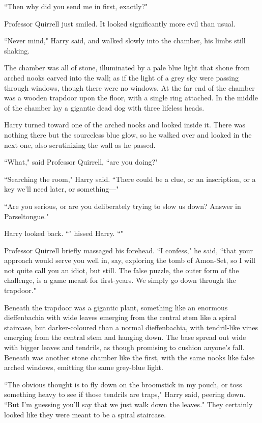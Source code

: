 ``Then why did you send me in first, exactly?"

Professor Quirrell just smiled. It looked significantly more evil than usual.

``Never mind," Harry said, and walked slowly into the chamber, his limbs still shaking.

The chamber was all of stone, illuminated by a pale blue light that shone from arched nooks carved into the wall; as if the light of a grey sky were passing through windows, though there were no windows. At the far end of the chamber was a wooden trapdoor upon the floor, with a single ring attached. In the middle of the chamber lay a gigantic dead dog with three lifeless heads.

Harry turned toward one of the arched nooks and looked inside it. There was nothing there but the sourceless blue glow, so he walked over and looked in the next one, also scrutinizing the wall as he passed.

``What," said Professor Quirrell, ``are you doing?"

``Searching the room," Harry said. ``There could be a clue, or an inscription, or a key we'll need later, or something—"

``Are you serious, or are you deliberately trying to slow us down? Answer in Parseltongue."

Harry looked back. ``" hissed Harry. ``"

Professor Quirrell briefly massaged his forehead. ``I confess," he said, ``that your approach would serve you well in, say, exploring the tomb of Amon-Set, so I will not quite call you an idiot, but still. The false puzzle, the outer form of the challenge, is a game meant for first-years. We simply go down through the trapdoor."

Beneath the trapdoor was a gigantic plant, something like an enormous dieffenbachia with wide leaves emerging from the central stem like a spiral staircase, but darker-coloured than a normal dieffenbachia, with tendril-like vines emerging from the central stem and hanging down. The base spread out wide with bigger leaves and tendrils, as though promising to cushion anyone's fall. Beneath was another stone chamber like the first, with the same nooks like false arched windows, emitting the same grey-blue light.

``The obvious thought is to fly down on the broomstick in my pouch, or toss something heavy to see if those tendrils are traps," Harry said, peering down. ``But I'm guessing you'll say that we just walk down the leaves." They certainly looked like they were meant to be a spiral staircase.

